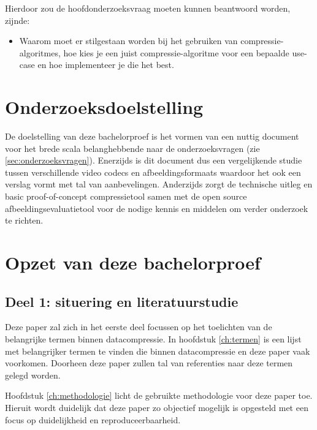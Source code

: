 Hierdoor zou de hoofdonderzoeksvraag moeten kunnen beantwoord worden, zijnde:
\begin{itemize}
	\item Waarom moet er stilgestaan worden bij het gebruiken van \glspl{compressie-algoritme}, hoe kies je een juist \gls{compressie-algoritme} voor een bepaalde \gls{use-case} en hoe implementeer je die het best.
\end{itemize}

\section{Onderzoeksdoelstelling}
\label{sec:onderzoeksdoelstelling}

De doelstelling van deze bachelorproef is het vormen van een nuttig document voor het brede scala belanghebbende naar de onderzoeksvragen (zie \ref{sec:onderzoeksvragen}). Enerzijds is dit document dus een vergelijkende studie tussen verschillende video \glspl{codec} en \glspl{afbeeldingsformaat} waardoor het ook een verslag vormt met tal van aanbevelingen. Anderzijds zorgt de technische uitleg en basic proof-of-concept \gls{compressietool} samen met de open source \gls{afbeeldingsevaluatietool} voor de nodige kennis en middelen om verder onderzoek te richten.


\section{Opzet van deze bachelorproef}
\label{sec:opzet-bachelorproef}
\subsection{Deel 1: situering en literatuurstudie}
\label{sec:opzet-bachelorproef-deel-1}

Deze paper zal zich in het eerste deel focussen op het toelichten van de belangrijke termen binnen \gls{datacompressie}. In hoofdstuk \ref{ch:termen} is een lijst met belangrijker termen te vinden die binnen \gls{datacompressie} en deze paper vaak voorkomen. Doorheen deze paper zullen tal van referenties naar deze termen gelegd worden. 

Hoofdstuk \ref{ch:methodologie} licht de gebruikte methodologie voor deze paper toe. Hieruit wordt duidelijk dat deze paper zo objectief mogelijk is opgesteld met een focus op duidelijkheid en reproduceerbaarheid.

